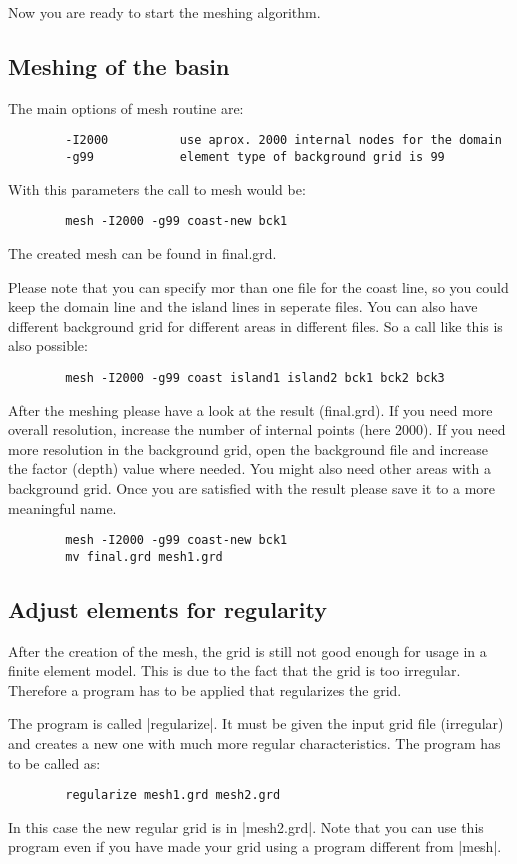 Now you are ready to start the meshing algorithm.

\subsection{Meshing of the basin}

The main options of mesh routine are:

\begin{verbatim}
        -I2000          use aprox. 2000 internal nodes for the domain
        -g99            element type of background grid is 99
\end{verbatim}

With this parameters the call to mesh would be:

\begin{verbatim}
        mesh -I2000 -g99 coast-new bck1
\end{verbatim}

The created mesh can be found in final.grd.

Please note that you can specify mor than one file for the coast line,
so you could keep the domain line and the island lines in seperate files.
You can also have different background grid for different areas in
different files. So a call like this is also possible:

\begin{verbatim}
        mesh -I2000 -g99 coast island1 island2 bck1 bck2 bck3
\end{verbatim}

After the meshing please have a look at the result (final.grd).
If you need more overall resolution, increase the number of internal
points (here 2000). If you need more resolution in the background grid,
open the background file and increase the factor (depth) value where needed.
You might also need other areas with a background grid. Once you
are satisfied with the result please save it to a more meaningful name.

\begin{verbatim}
        mesh -I2000 -g99 coast-new bck1
        mv final.grd mesh1.grd
\end{verbatim}

\subsection{Adjust elements for regularity}

After the creation of the mesh, the grid is still not good enough
for usage in a finite element model. This is due to the fact that
the grid is too irregular. Therefore a program has to be applied
that regularizes the grid.

The program is called |regularize|. It must be given the input grid file
(irregular) and creates a new one with much more regular characteristics.
The program has to be called as:

\begin{verbatim}
        regularize mesh1.grd mesh2.grd
\end{verbatim}

In this case the new regular grid is in |mesh2.grd|. Note that you
can use this program even if you have made your grid using a program
different from |mesh|.

